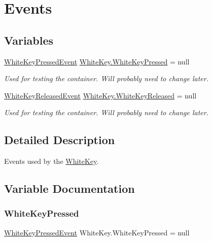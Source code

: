 \hypertarget{group___white_key_events}{}\section{Events}
\label{group___white_key_events}
\subsection*{Variables}
\begin{DoxyCompactItemize}
\item 
\hyperlink{group___white_key_event_types_class_white_key_1_1_white_key_pressed_event}{White\+Key\+Pressed\+Event} \hyperlink{group___white_key_events_gab84691fc1e9f7b62884589d1813433e2}{White\+Key.\+White\+Key\+Pressed} = null
\begin{DoxyCompactList}\small\item\em Used for testing the container. Will probably need to change later. \end{DoxyCompactList}\item 
\hyperlink{group___white_key_event_types_class_white_key_1_1_white_key_released_event}{White\+Key\+Released\+Event} \hyperlink{group___white_key_events_ga180e88cd7ab95af43231f53469e87830}{White\+Key.\+White\+Key\+Released} = null
\begin{DoxyCompactList}\small\item\em Used for testing the container. Will probably need to change later. \end{DoxyCompactList}\end{DoxyCompactItemize}


\subsection{Detailed Description}
Events used by the \hyperlink{class_white_key}{White\+Key}. 

\subsection{Variable Documentation}
\mbox{\label{group___white_key_events_gab84691fc1e9f7b62884589d1813433e2}} 
\subsubsection{\texorpdfstring{White\+Key\+Pressed}{WhiteKeyPressed}}
{\footnotesize\ttfamily \hyperlink{group___white_key_event_types_class_white_key_1_1_white_key_pressed_event}{White\+Key\+Pressed\+Event} White\+Key.\+White\+Key\+Pressed = null}



